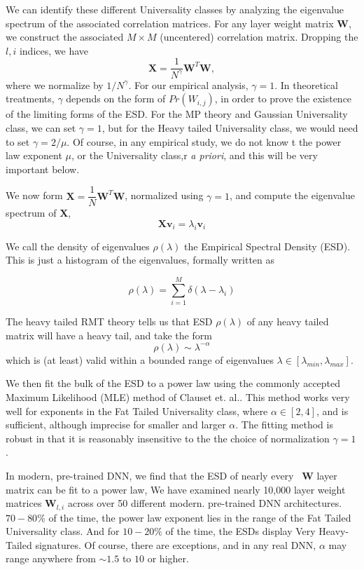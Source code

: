 We can identify these different Universality classes by analyzing the eigenvalue spectrum of the associated correlation matrices. 
For any layer weight matrix $\mathbf{W}$, we construct the associated $M\times M$ (uncentered) correlation matrix. 
Dropping the $l,i$ indices, we have
\begin{equation}
\mathbf{X} = \dfrac{1}{N^{\gamma}}\mathbf{W}^{T}\mathbf{W}  ,
\label{eqn:unc_corr_mat}
\end{equation}
where we normalize by $1/N^{\gamma}$. 
For our empirical analysis, $\gamma=1$. 
In theoretical treatments, $\gamma$ depends on the form of $Pr(W_{i,j})$, in order to prove the existence of the limiting forms of the ESD.
For the MP theory and Gaussian Universality class, we can set $\gamma=1$, but for the Heavy tailed Universality class, we would need to set $\gamma=2/\mu$.
Of course, in any empirical study, we do not know t the power law exponent $\mu$, or the Universality class,r \emph{a priori}, and this will be very important below. 

We now form $\mathbf{X}= \dfrac{1}{N}\mathbf{W}^{T}\mathbf{W}$, normalized using $\gamma=1$, and compute the eigenvalue spectrum of $\mathbf{X}$, 
$$
\mathbf{X}\mathbf{v}_{i}=\lambda_{i}\mathbf{v}_{i}
$$

We call the density of eigenvalues $\rho(\lambda)$ the Empirical Spectral Density (ESD).  This is just a histogram of the eigenvalues, formally written as

$$\rho(\lambda)=\sum\limits_{i=1}^{M}\delta(\lambda-\lambda_{i})$$

The heavy tailed RMT theory tells us that ESD  $\rho(\lambda)$ of any heavy tailed matrix will have a heavy tail, and take the form
$$
\rho(\lambda)\sim\lambda^{-\alpha}
$$
which is (at least) valid within a bounded range of eigenvalues $\lambda\in[\lambda_{min},\lambda_{max}]$.  

We then fit the bulk of the ESD to a power law using the commonly accepted Maximum Likelihood (MLE) method of Clauset et. al..
This method works very well for exponents in the  Fat Tailed Universality class, where $\alpha\in[2,4]$,
and is sufficient, although imprecise for smaller and larger $\alpha$.  The fitting method is robust in that it is  reasonably
insensitive to the the choice of normalization $\gamma=1$.


In modern, pre-trained DNN, we find that the ESD of nearly every \ $\mathbf{W}$ layer matrix can be fit to a power law,
We have examined nearly 10,000 layer weight matrices $\mathbf{W}_{l,i}$ across over 50 different modern. pre-trained DNN architectures.  
 $70-80\%$ of the time, the power law exponent lies in the range of the Fat Tailed Universality class.
And for $10-20\%$ of the time, the ESDs display Very Heavy-Tailed signatures.
Of course, there are exceptions, and in any real DNN,  $\alpha$ may range anywhere from $\sim1.5$ to $10$ or higher.  


